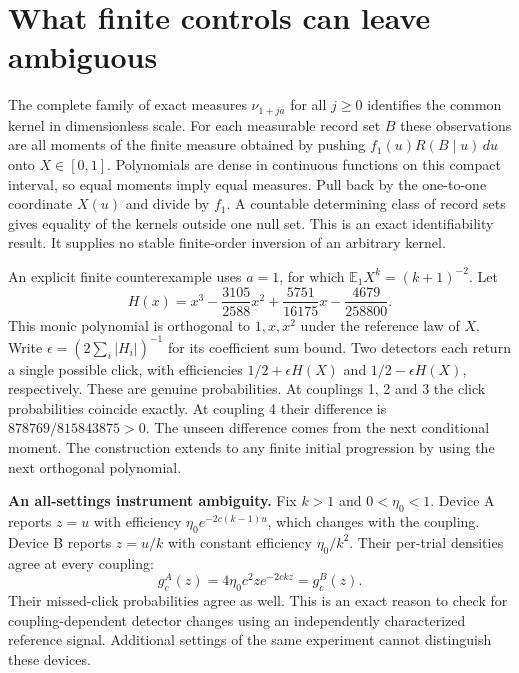 \documentclass[10pt,a4paper]{article}
\begin{document}
\section{What finite controls can leave ambiguous}
The complete family of exact measures $\nu_{1+ja}$ for all $j\ge0$ identifies the common kernel in dimensionless scale. For each measurable record set $B$ these observations are all moments of the finite measure obtained by pushing $f_1(u)R(B\mid u)\,du$ onto $X\in[0,1]$. Polynomials are dense in continuous functions on this compact interval, so equal moments imply equal measures. Pull back by the one-to-one coordinate $X(u)$ and divide by $f_1$. A countable determining class of record sets gives equality of the kernels outside one null set. This is an exact identifiability result. It supplies no stable finite-order inversion of an arbitrary kernel.

An explicit finite counterexample uses $a=1$, for which $\mathbb E_1 X^k=(k+1)^{-2}$. Let
\[
 H(x)=x^3-\frac{3105}{2588}x^2+\frac{5751}{16175}x-\frac{4679}{258800}.
\]
This monic polynomial is orthogonal to $1,x,x^2$ under the reference law of $X$. Write $\epsilon=(2\sum_i|H_i|)^{-1}$ for its coefficient sum bound. Two detectors each return a single possible click, with efficiencies $1/2+\epsilon H(X)$ and $1/2-\epsilon H(X)$, respectively. These are genuine probabilities. At couplings 1, 2 and 3 the click probabilities coincide exactly. At coupling 4 their difference is $878769/815843875>0$. The unseen difference comes from the next conditional moment. The construction extends to any finite initial progression by using the next orthogonal polynomial.

\textbf{An all-settings instrument ambiguity.} Fix $k>1$ and $0<\eta_0<1$. Device A reports $z=u$ with efficiency $\eta_0 e^{-2c(k-1)u}$, which changes with the coupling. Device B reports $z=u/k$ with constant efficiency $\eta_0/k^2$. Their per-trial densities agree at every coupling:
\[
 g_c^A(z)=4\eta_0c^2z e^{-2ckz}=g_c^B(z).
\]
Their missed-click probabilities agree as well. This is an exact reason to check for coupling-dependent detector changes using an independently characterized reference signal. Additional settings of the same experiment cannot distinguish these devices.
\end{document}

